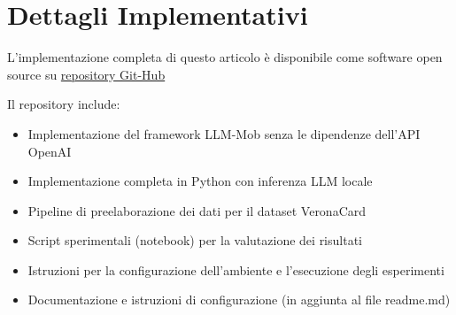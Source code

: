 \section{Dettagli Implementativi}

L'implementazione completa di questo articolo è disponibile come software open source su \href{https://github.com/simo-hue/LLM-Mob-As-Mobility-Interpreter.git}{repository Git-Hub}

Il repository include:
\begin{itemize}
\item Implementazione del framework LLM-Mob senza le dipendenze dell'API OpenAI
\item Implementazione completa in Python con inferenza LLM locale
\item Pipeline di preelaborazione dei dati per il dataset VeronaCard
\item Script sperimentali (notebook) per la valutazione dei risultati
\item Istruzioni per la configurazione dell'ambiente e l'esecuzione degli esperimenti
\item Documentazione e istruzioni di configurazione (in aggiunta al file readme.md)
\end{itemize}

